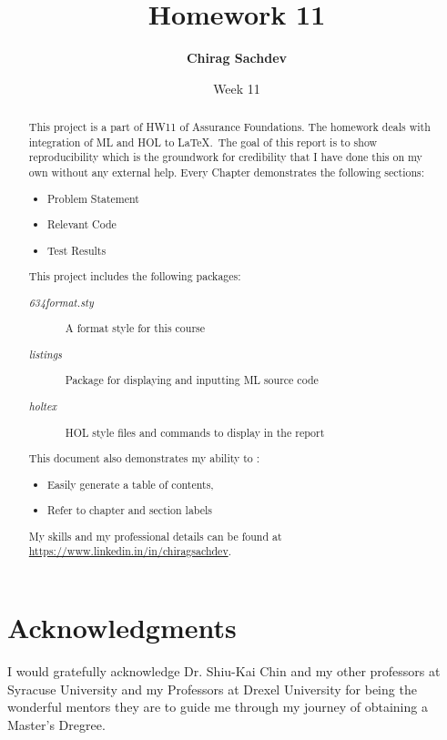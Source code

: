 \documentclass{report}
\title{Homework 11}
\author{\textbf{Chirag Sachdev}}
\date{Week 11}
\begin{document}
\lstset{language=ML, breaklines=true, basicstyle=\small}
\maketitle{}

\begin{abstract}
This project is a part of HW11 of Assurance Foundations. The homework deals with integration of ML and HOL to \LaTeX.\ The goal of this report is to show reproducibility which is the groundwork for credibility that I have done this on my own without any external help. Every Chapter demonstrates the following sections:
	\begin{itemize}
		\item Problem Statement
		\item Relevant Code
		\item Test Results
	\end{itemize}
	
This project includes the following packages:
	\begin{description}
		\item[\emph{634format.sty}] A format style for this course
		\item[\emph{listings}] Package for displaying and inputting ML source code
		\item[\emph{holtex}] HOL style files and commands to display in the report
	\end{description}

This document also demonstrates my ability to :
	\begin{itemize}
		\item Easily generate a table of contents,
		\item Refer to chapter and section labels
	\end{itemize}

My skills and my professional details can be found at \url{https://www.linkedin.in/in/chiragsachdev}.
\end{abstract}

\section*{Acknowledgments}
I would gratefully acknowledge Dr. Shiu-Kai Chin and my other professors at Syracuse University and my Professors at Drexel University for being the wonderful mentors they are to guide me through my journey of obtaining a Master's Dregree.

\tableofcontents{}
\end{document}
